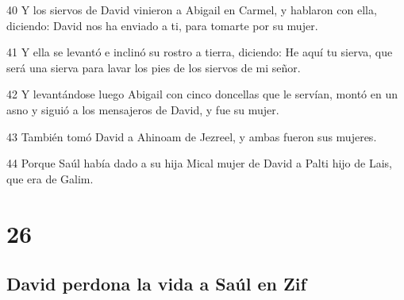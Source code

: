 \par 40 Y los siervos de David vinieron a Abigail en Carmel, y hablaron con ella, diciendo: David nos ha enviado a ti, para tomarte por su mujer.
\par 41 Y ella se levantó e inclinó su rostro a tierra, diciendo: He aquí tu sierva, que será una sierva para lavar los pies de los siervos de mi señor.
\par 42 Y levantándose luego Abigail con cinco doncellas que le servían, montó en un asno y siguió a los mensajeros de David, y fue su mujer.
\par 43 También tomó David a Ahinoam de Jezreel, y ambas fueron sus mujeres.
\par 44 Porque Saúl había dado a su hija Mical mujer de David a Palti hijo de Lais, que era de Galim.

\chapter{26}

\section*{David perdona la vida a Saúl en Zif}

